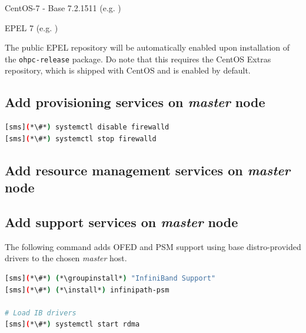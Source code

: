 \documentclass[letterpaper]{article}
\newcommand{\install}{yum -y install}
\newcommand{\groupinstall}{yum -y groupinstall}
\begin{document}
\begin{itemize*}
\item CentOS-7 - Base 7.2.1511
  (e.g. \href{http://mirror.centos.org/centos-7/7.2.1511/os/x86\_64}
             {\color{blue}{http://mirror.centos.org/centos-7/7.2.1511/os/x86\_64}} )
\item EPEL 7 (e.g. \href{http://download.fedoraproject.org/pub/epel/7/x86\_64}
                        {\color{blue}{http://download.fedoraproject.org/pub/epel/7/x86\_64}} )
\end{itemize*}

The public EPEL repository will be automatically enabled upon installation of the 
\texttt{ohpc-release} package. Do note that this requires the CentOS Extras
repository, which is shipped with CentOS and is enabled by default.




\subsection{Add provisioning services on {\em master} node} \label{sec:add_provisioning}



\begin{lstlisting}[language=bash,keywords={}]
[sms](*\#*) systemctl disable firewalld
[sms](*\#*) systemctl stop firewalld
\end{lstlisting}



\subsection{Add resource management services on {\em master} node} \label{sec:add_rm}


\subsection{Add \InfiniBand{} support services on {\em master} node} \label{sec:add_ofed}

The following command adds OFED and PSM support using base distro-provided drivers
to the chosen {\em master} host.

\begin{lstlisting}[language=bash,keywords={}]
[sms](*\#*) (*\groupinstall*) "InfiniBand Support"
[sms](*\#*) (*\install*) infinipath-psm

# Load IB drivers
[sms](*\#*) systemctl start rdma
\end{lstlisting}
\end{document}
